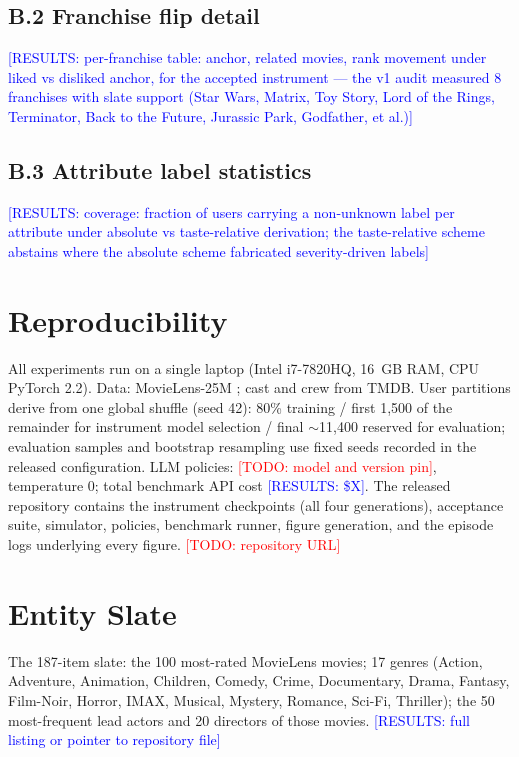 \documentclass[11pt]{article}
\newcommand{\todo}[1]{\textcolor{red}{[TODO: #1]}}
\newcommand{\results}[1]{\textcolor{blue}{[RESULTS: #1]}}
\begin{document}
\subsection*{B.2 Franchise flip detail}
\results{per-franchise table: anchor, related movies, rank movement under
liked vs disliked anchor, for the accepted instrument --- the v1 audit
measured 8 franchises with slate support (Star Wars, Matrix, Toy Story,
Lord of the Rings, Terminator, Back to the Future, Jurassic Park,
Godfather, et al.)}

\subsection*{B.3 Attribute label statistics}
\results{coverage: fraction of users carrying a non-unknown label per
attribute under absolute vs taste-relative derivation; the taste-relative
scheme abstains where the absolute scheme fabricated severity-driven
labels}

\section{Reproducibility}
\label{app:repro}

All experiments run on a single laptop (Intel i7-7820HQ, 16~GB RAM, CPU
PyTorch 2.2). Data: MovieLens-25M \citep{harper2015movielens}; cast and
crew from TMDB. User partitions derive from one global shuffle (seed 42):
80\% training / first 1{,}500 of the remainder for instrument model
selection / final $\sim$11{,}400 reserved for evaluation; evaluation
samples and bootstrap resampling use fixed seeds recorded in the released
configuration. LLM policies: \todo{model and version pin}, temperature 0;
total benchmark API cost \results{\$X}. The released repository contains
the instrument checkpoints (all four generations), acceptance suite,
simulator, policies, benchmark runner, figure generation, and the episode
logs underlying every figure. \todo{repository URL}

\section{Entity Slate}
\label{app:slate}

The 187-item slate: the 100 most-rated MovieLens movies; 17 genres
(Action, Adventure, Animation, Children, Comedy, Crime, Documentary,
Drama, Fantasy, Film-Noir, Horror, IMAX, Musical, Mystery, Romance,
Sci-Fi, Thriller); the 50 most-frequent lead actors and 20 directors of
those movies. \results{full listing or pointer to repository file}
\end{document}
